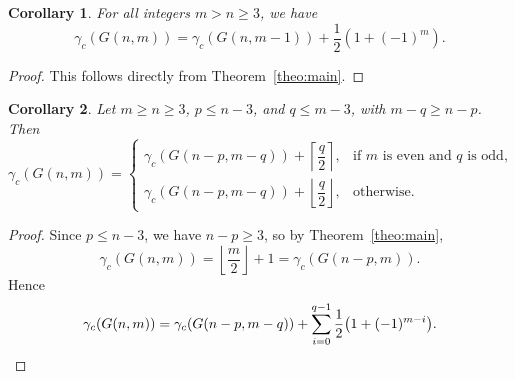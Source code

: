 \documentclass[letterpaper,12pt]{article}
\newtheorem{corollary}{Corollary}
\begin{document}
 

\begin{corollary}  
For all integers $m > n \geq 3$, we have  
\begin{equation}\label{rec_2}
    \gamma_c(G(n,m)) = \gamma_c(G(n,m-1)) + \frac{1}{2}\left( 1 + (-1)^m \right).
\end{equation}
\end{corollary}
\begin{proof}
    This follows directly from Theorem~\ref{theo:main}.\qedhere
\end{proof}



\begin{corollary}
Let $m \geq n \geq 3$, $p \leq n-3$, and $q \leq m-3$, with $m-q \geq n-p$. Then  
\begin{equation}
    \gamma_c(G(n,m)) =
    \begin{cases}
        \gamma_c(G(n-p,m-q)) + \left\lceil \dfrac{q}{2} \right\rceil, & \text{if $m$ is even and $q$ is odd}, \\[8pt]
        \gamma_c(G(n-p,m-q)) + \left\lfloor \dfrac{q}{2} \right\rfloor, & \text{otherwise}.
    \end{cases}
\end{equation}
\end{corollary}

\begin{proof}
Since $p\le n-3$, we have $n-p\ge 3$, so by Theorem~\ref{theo:main},
\[
\gamma_c(G(n,m))=\left\lfloor\frac{m}{2}\right\rfloor+1
=\gamma_c(G(n-p,m)).
\]
Hence
\[
\gamma_c(G(n,m))
=\gamma_c(G(n-p,m-q))+\sum_{i=0}^{q-1}\frac12\bigl(1+(-1)^{m-i}\bigr).\qedhere
\]
\end{proof}




\end{document}
